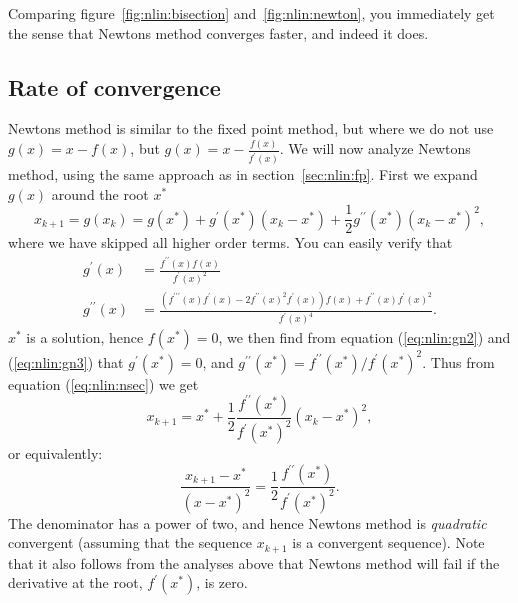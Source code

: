 \documentclass[graybox,sectrefs,envcountresetchap,open=right,final]{svmonodo}
\begin{document}
Comparing figure~\ref{fig:nlin:bisection} and~\ref{fig:nlin:newton}, you immediately get the sense that Newtons method converges faster, and indeed it does. 

\subsection{Rate of convergence}
 Newtons method is similar to the fixed point method, but where we do not use $g(x)=x-f(x)$, but $g(x)=x-\frac{f(x)}{f^\prime(x)}$. We will now analyze Newtons method, using the same approach as in section~\ref{sec:nlin:fp}. First we expand $g(x)$ around the root $x^*$
\begin{equation}
x_{k+1}=g(x_k)=g(x^*)+g^\prime(x^*)(x_k-x^*)+\frac{1}{2}g^{\prime\prime}(x^*)(x_k-x^*)^2,
\label{eq:nlin:nsec}
\end{equation}
where we have skipped all higher order terms. You can easily verify that
\begin{align}
g^\prime(x) &=\frac{f^{\prime\prime}(x)f(x)}{f^\prime(x)^2}
\label{eq:nlin:gn2} \\ 
g^{\prime\prime}(x) &=\frac{(f^{\prime\prime\prime}(x)f^\prime(x)-2f^{\prime\prime}(x)^2f^\prime(x))f(x)
+f^{\prime\prime}(x)f^\prime(x)^2}{f^\prime(x)^4}.
\label{eq:nlin:gn3}
\end{align}
$x^*$ is a solution, hence $f(x^*)=0$, we then find from equation (\ref{eq:nlin:gn2}) and (\ref{eq:nlin:gn3}) that $g^\prime(x^*)=0$, and $g^{\prime\prime}(x^*)=f^{\prime\prime}(x^*)/f^{\prime}(x^*)^2$. Thus from equation (\ref{eq:nlin:nsec}) we get
\begin{equation}
x_{k+1}=x^*+\frac{1}{2}\frac{f^{\prime\prime}(x^*)}{f^{\prime}(x^*)^2}(x_k-x^*)^2,
\label{eq:nlin:nsecn}
\end{equation}
or equivalently:
\begin{equation}
\frac{x_{k+1}-x^*}{(x-x^*)^2}=\frac{1}{2}\frac{f^{\prime\prime}(x^*)}{f^{\prime}(x^*)^2}.
\label{eq:nlin:nsecn2}
\end{equation}
The denominator has a power of two, and hence Newtons method is \emph{quadratic} convergent (assuming that the sequence $x_{k+1}$ is a convergent sequence). Note that it also follows from the analyses above that Newtons method will fail if the derivative at the root, $f^\prime(x^*)$, is zero.
\end{document}
